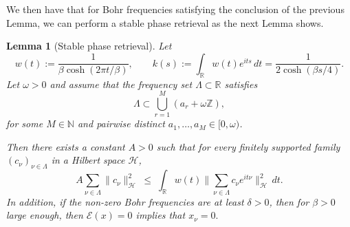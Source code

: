 \documentclass[11pt]{amsart}
\newcommand{\1}{\mathbbm{1}}
\theoremstyle{plain}
\newtheorem{lemma}[theorem]{Lemma}
\theoremstyle{definition}
\theoremstyle{remark}
\numberwithin{equation}{section}
\begin{document}
We then have that for Bohr frequencies satisfying the conclusion of the previous Lemma, we can perform a stable phase retrieval as the next Lemma shows.
\begin{lemma}[Stable phase retrieval]\label{lem:Riesz_finite_lattices}
Let
\[
w(t):=\frac{1}{\beta\cosh(2\pi t/\beta)}, 
\qquad
k(s):=\int_{\mathbb R} w(t)e^{its}\,dt
= \frac{1}{2\cosh(\beta s/4)}.
\]
Let $\omega>0$ and assume that the frequency set $\Lambda\subset\mathbb R$ satisfies
\[
\Lambda \subset \bigcup_{r=1}^M (a_r+\omega\mathbb Z),
\]
for some $M\in\mathbb N$ and pairwise distinct $a_1,\dots,a_M\in[0,\omega)$.

Then there exists a constant $A>0$ such that for every finitely supported family $(c_\nu)_{\nu\in\Lambda}$ in a Hilbert space $\mathcal H$,
\begin{equation}\label{eq:Riesz_lower}
A \sum_{\nu\in\Lambda} \|c_\nu\|_{\mathcal H}^2
\;\le\;
\int_{\mathbb R} w(t)\Big\|\sum_{\nu\in\Lambda} c_\nu e^{it\nu}\Big\|_{\mathcal H}^2\,dt.
\end{equation}
In addition, if the non-zero Bohr frequencies are at least $\delta>0$, then for $\beta>0$ large enough, then $\mathcal E(x)=0$ implies that $x_{\nu}=0.$
\end{lemma}
\end{document}
